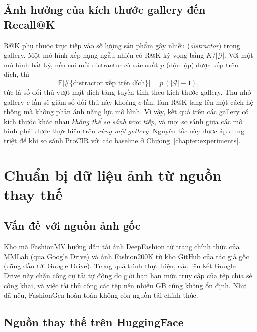 \subsection{Ảnh hưởng của kích thước gallery đến Recall@K}\label{sec:gallery-size-theory}

R@K phụ thuộc trực tiếp vào số lượng sản phẩm gây nhiễu (\emph{distractor}) trong gallery. Một mô hình xếp hạng ngẫu nhiên có R@K kỳ vọng bằng $K / |\mathcal{G}|$. Với một mô hình bất kỳ, nếu coi mỗi distractor có xác suất $p$ (độc lập) được xếp trên đích, thì
\begin{equation}
    \mathbb{E}\big[\#\{\text{distractor xếp trên đích}\}\big] = p\,(|\mathcal{G}| - 1),
\end{equation}
tức là số đối thủ vượt mặt đích tăng tuyến tính theo kích thước gallery. Thu nhỏ gallery $c$ lần sẽ giảm số đối thủ này khoảng $c$ lần, làm R@K tăng lên một cách hệ thống mà không phản ánh năng lực mô hình. Vì vậy, kết quả trên các gallery có kích thước khác nhau \emph{không thể so sánh trực tiếp}, và mọi so sánh giữa các mô hình phải được thực hiện trên \emph{cùng một gallery}. Nguyên tắc này được áp dụng triệt để khi so sánh ProCIR với các baseline ở Chương~\ref{chapter:experiments}.

\section{Chuẩn bị dữ liệu ảnh từ nguồn thay thế}\label{sec:data-prep}

\subsection{Vấn đề với nguồn ảnh gốc}

Kho mã FashionMV hướng dẫn tải ảnh DeepFashion từ trang chính thức của MMLab (qua Google Drive) và ảnh Fashion200K từ kho GitHub của tác giả gốc (cũng dẫn tới Google Drive). Trong quá trình thực hiện, các liên kết Google Drive này chặn công cụ tải tự động do giới hạn hạn mức truy cập của tệp chia sẻ công khai, và việc tải thủ công các tệp nén nhiều GB cũng không ổn định. Như đã nêu, FashionGen hoàn toàn không còn nguồn tải chính thức.

\subsection{Nguồn thay thế trên HuggingFace}

